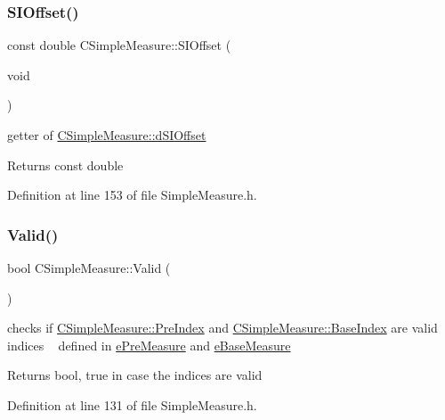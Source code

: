 \subsubsection{\texorpdfstring{S\+I\+Offset()}{SIOffset()}}
{\footnotesize\ttfamily const double C\+Simple\+Measure\+::\+S\+I\+Offset (\begin{DoxyParamCaption}\item[{void}]{ }\end{DoxyParamCaption})\hspace{0.3cm}{\ttfamily [inline]}}



getter of \hyperlink{classCSimpleMeasure_a27c1637c744a79856ee81869e2aa8890}{C\+Simple\+Measure\+::d\+S\+I\+Offset} 

\begin{DoxyReturn}{Returns}
const double 
\end{DoxyReturn}


Definition at line 153 of file Simple\+Measure.\+h.

\mbox{\label{classCSimpleMeasure_ac4c8b1c22393c6d9a6381f3d8dfdf3e4}} 
\subsubsection{\texorpdfstring{Valid()}{Valid()}}
{\footnotesize\ttfamily bool C\+Simple\+Measure\+::\+Valid (\begin{DoxyParamCaption}{ }\end{DoxyParamCaption})\hspace{0.3cm}{\ttfamily [inline]}}



checks if \hyperlink{classCSimpleMeasure_aa23ed9eec21adb9a97c90a424e7ee18a}{C\+Simple\+Measure\+::\+Pre\+Index} and \hyperlink{classCSimpleMeasure_a191dbfa4cc374946bf8a82111f827d92}{C\+Simple\+Measure\+::\+Base\+Index} are valid indices ~\newline
 defined in \hyperlink{PreMeasure_8h_a6c81167b8d4c2badde42f81cb7214620}{e\+Pre\+Measure} and \hyperlink{BaseMeasure_8h_ac90e5164ccf1f0d648fba7e94b229a11}{e\+Base\+Measure} 

\begin{DoxyReturn}{Returns}
bool, true in case the indices are valid 
\end{DoxyReturn}


Definition at line 131 of file Simple\+Measure.\+h.



